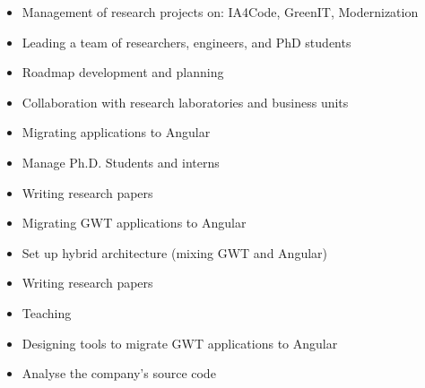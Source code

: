 \documentclass[10pt,a4paper,ragged2e,withhyper]{altacv}
\begin{document}
\begin{paracol}{2}


\begin{itemize}
\item Management of research projects on: IA4Code, GreenIT, Modernization
\item Leading a team of researchers, engineers, and PhD students
\item Roadmap development and planning
\item Collaboration with research laboratories and business units
\end{itemize}

\divider


\begin{itemize}
  \item Migrating applications to Angular
  \item Manage Ph.D. Students and interns
  \item Writing research papers
\end{itemize}

\divider


\begin{itemize}
  \item Migrating GWT applications to Angular
  \item Set up hybrid architecture (mixing GWT and Angular)
  \item Writing research papers
  \item Teaching
\end{itemize}

\divider


\begin{itemize}
  \item Designing tools to migrate GWT applications to Angular
  \item Analyse the company's source code
\end{itemize}

\divider


\end{paracol}
\end{document}

